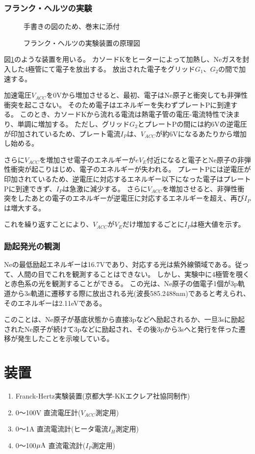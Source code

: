 \documentclass[uplatex,11pt]{jsarticle}
\newcommand{\dummyfig}[2]{
    \begin{figure}
        \begin{center}
            \begin{shadebox}
                手書きの図のため、巻末に添付
            \end{shadebox}
            \caption{#2}
            \label{fg_#1}
        \end{center}
    \end{figure}
}
\newcommand{\fr}[1]{図\ref{fg_#1}}
\begin{document}
\subsubsection{フランク・ヘルツの実験}

\dummyfig{vaccum_tube}{フランク・ヘルツの実験装置の原理図}

\fr{vaccum_tube}のような装置を用いる。
カソードKをヒーターによって加熱し、Neガスを封入した4極管にて電子を放出する。
放出された電子をグリッド$G_1$、$G_2$の間で加速する。

加速電圧$V_{ACC}$を0Vから増加させると、最初、電子はNe原子と衝突しても非弾性衝突を起こさない。
そのため電子はエネルギーを失わずプレートPに到達する。
このとき、カソードKから流れる電流は熱電子管の電圧-電流特性で決まり、単調に増加する。
ただし、グリッド$G_2$とプレートPの間には約6Vの逆電圧が印加されているため、プレート電流$I_P$は、$V_{ACC}$が約6Vになるあたりから増加し始める。

さらに$V_{ACC}$を増加させ電子のエネルギーが$eV_E$付近になると電子とNe原子の非弾性衝突が起こりはじめ、電子のエネルギーが失われる。
プレートPには逆電圧が印加されているため、逆電圧に対応するエネルギー以下になった電子はプレートPに到達できず、$I_P$は急激に減少する。
さらに$V_{ACC}$を増加させると、非弾性衝突をしたあとの電子のエネルギーが逆電圧に対応するエネルギーを超え、再び$I_P$は増大する。

これを繰り返すことにより、$V_{ACC}$が$V_E$だけ増加するごとに$I_P$は極大値を示す。

\subsubsection{励起発光の観測}

Neの最低励起エネルギーは16.7Vであり、対応する光は紫外線領域である。従って、人間の目でこれを観測することはできない。
しかし、実験中に4極管を覗くと赤色系の光を観測することができる。
この光は、Ne原子の価電子1個が3p軌道から3s軌道に遷移する際に放出される光(波長585.2488nm)であると考えられ、そのエネルギーは2.11eVである。

このことは、Ne原子が基底状態から直接3pなどへ励起されるか、一旦3sに励起されたNe原子が続けて3pなどに励起され、その後3pから3sへと発行を伴った遷移が発生したことを示唆している。

\section{装置}

\begin{enumerate}
    \item Franck-Hertz実験装置(京都大学-KKエクレア社協同制作)
    \item 0〜100V 直流電圧計($V_{ACC}$測定用)
    \item 0〜1A 直流電流計(ヒータ電流$I_H$測定用)
    \item 0〜100$\mu {\rm A}$ 直流電流計($I_P$測定用)
\end{enumerate}
\end{document}
